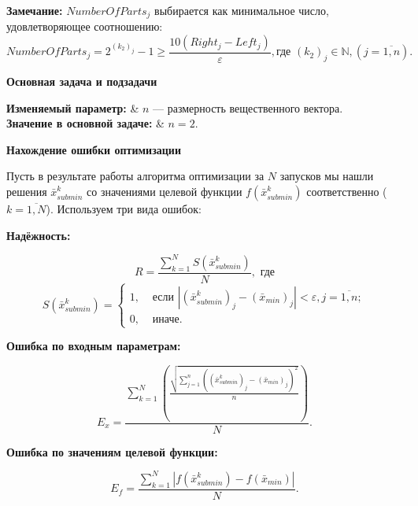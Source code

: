 \documentclass[a4paper,12pt]{article}
\begin{document}
\textbf{Замечание:}  $NumberOfParts_j$ выбирается как минимальное число, удовлетворяющее соотношению:
\begin{equation*}
NumberOfParts_j=2^{\left( k_2\right)_j }-1\geq\dfrac{10\left( Right_j-Left_j\right) }{\varepsilon},\text{где } \left( k_2\right)_j \in \mathbb{N}, \left( j=\overline{1,n}\right).
\end{equation*}

\textbf {Основная задача и подзадачи}

\begin{tabularwide}
\textbf{Изменяемый параметр: } & $n$ --- размерность вещественного вектора. \\
\textbf{Значение в основной задаче:} & $n=2$.\\
\end{tabularwide}

\textbf {Нахождение ошибки оптимизации}

Пусть в результате работы алгоритма оптимизации за $N$ запусков мы нашли решения $\bar{x}_{submin}^k$ со значениями целевой функции $f\left( \bar{x}_{submin}^k\right) $ соответственно ($k=\overline{1,N}$). Используем три вида ошибок:

\textbf{Надёжность: }

\begin{equation*}
R = \dfrac{\sum_{k=1}^{N}S\left( \bar{x}_{submin}^k \right) }{N}, \text{ где}
\end{equation*}
\begin{equation*}
S\left( \bar{x}_{submin}^k \right)=\left\lbrace \begin{aligned} 1,& \text{ если } \left| \left( \bar{x}_{submin}^k \right)_j-\left( \bar{x}_{min} \right)_j\right|<\varepsilon, j=\overline{1,n};   \\ 0,& \text{ иначе}. \end{aligned}\right.
\end{equation*}

\textbf{Ошибка по входным параметрам:}

\begin{equation*}
E_x = \dfrac{\sum_{k=1}^{N} \left( \frac{\sqrt{\sum_{j=1}^{n}{\left( \left( \bar{x}_{submin}^k \right)_j-\left( \bar{x}_{min} \right)_j \right)}^2 }}{n} \right)  }{N}.
\end{equation*}

\textbf{Ошибка по значениям целевой функции: }

\begin{equation*}
E_f = \dfrac{\sum_{k=1}^{N} \left| f\left( \bar{x}_{submin}^k \right)-f\left( \bar{x}_{min} \right) \right|  }{N}.
\end{equation*}
\end{document}
